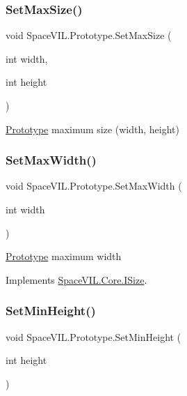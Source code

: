 \subsubsection{\texorpdfstring{Set\+Max\+Size()}{SetMaxSize()}}
{\footnotesize\ttfamily void Space\+V\+I\+L.\+Prototype.\+Set\+Max\+Size (\begin{DoxyParamCaption}\item[{int}]{width,  }\item[{int}]{height }\end{DoxyParamCaption})}



\mbox{\hyperlink{class_space_v_i_l_1_1_prototype}{Prototype}} maximum size (width, height) 

\mbox{\label{class_space_v_i_l_1_1_prototype_afb5b3eade68537c29e07b3da28782e96}} 
\subsubsection{\texorpdfstring{Set\+Max\+Width()}{SetMaxWidth()}}
{\footnotesize\ttfamily void Space\+V\+I\+L.\+Prototype.\+Set\+Max\+Width (\begin{DoxyParamCaption}\item[{int}]{width }\end{DoxyParamCaption})}



\mbox{\hyperlink{class_space_v_i_l_1_1_prototype}{Prototype}} maximum width 



Implements \mbox{\hyperlink{interface_space_v_i_l_1_1_core_1_1_i_size}{Space\+V\+I\+L.\+Core.\+I\+Size}}.

\mbox{\label{class_space_v_i_l_1_1_prototype_ab615ad8a0985630fa96cf13d7484a4bc}} 
\subsubsection{\texorpdfstring{Set\+Min\+Height()}{SetMinHeight()}}
{\footnotesize\ttfamily void Space\+V\+I\+L.\+Prototype.\+Set\+Min\+Height (\begin{DoxyParamCaption}\item[{int}]{height }\end{DoxyParamCaption})}



